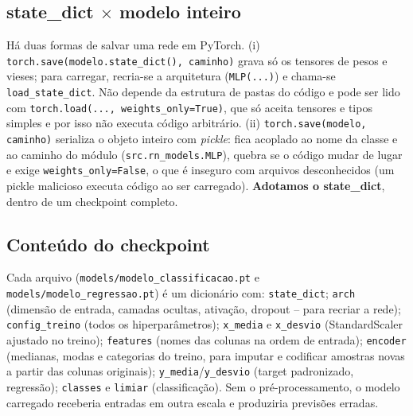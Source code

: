 \documentclass[11pt,a4paper]{article}
\begin{document}
\subsection{state\_dict $\times$ modelo inteiro}
Há duas formas de salvar uma rede em PyTorch. (i) \texttt{torch.save(modelo.state\_dict(), caminho)} grava só os tensores de pesos e
vieses; para carregar, recria-se a arquitetura (\texttt{MLP(...)}) e chama-se \texttt{load\_state\_dict}. Não depende da estrutura de
pastas do código e pode ser lido com \texttt{torch.load(..., weights\_only=True)}, que só aceita tensores e tipos simples e por isso
não executa código arbitrário. (ii) \texttt{torch.save(modelo, caminho)} serializa o objeto inteiro com \emph{pickle}: fica acoplado
ao nome da classe e ao caminho do módulo (\texttt{src.rn\_models.MLP}), quebra se o código mudar de lugar e exige
\texttt{weights\_only=False}, o que é inseguro com arquivos desconhecidos (um pickle malicioso executa código ao ser carregado).
\textbf{Adotamos o state\_dict}, dentro de um checkpoint completo.
\begin{table}[H]\centering\scriptsize{}
\caption{Tamanho em disco e relação com o número de parâmetros (float32). O overhead do checkpoint inclui média/desvio do scaler, nomes das features, codificação das categóricas e metadados do formato.}\label{tab:tam}\end{table}
\subsection{Conteúdo do checkpoint}
Cada arquivo (\texttt{models/modelo\_classificacao.pt} e \texttt{models/modelo\_regressao.pt}) é um dicionário com:
\texttt{state\_dict}; \texttt{arch} (dimensão de entrada, camadas ocultas, ativação, dropout -- para recriar a rede);
\texttt{config\_treino} (todos os hiperparâmetros); \texttt{x\_media} e \texttt{x\_desvio} (StandardScaler ajustado no treino);
\texttt{features} (nomes das colunas na ordem de entrada); \texttt{encoder} (medianas, modas e categorias do treino, para imputar e
codificar amostras novas a partir das colunas originais); \texttt{y\_media}/\texttt{y\_desvio} (target padronizado, regressão);
\texttt{classes} e \texttt{limiar} (classificação). Sem o pré-processamento, o modelo carregado receberia entradas em outra escala e
produziria previsões erradas.
\end{document}
